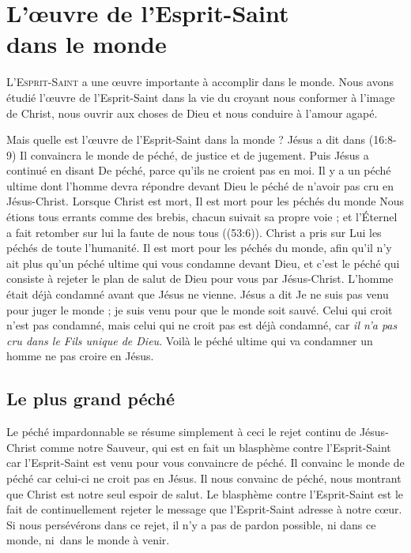 \chapter[L'\oe{}uvre de l'Esprit-Saint dans le monde]{L'\oe{}uvre de l'Esprit-Saint\\ dans le monde}

\lettrine{L}{'Esprit-Saint} a une œuvre importante
 à accomplir dans le monde.
 Nous avons étudié l'œuvre de l'Esprit-Saint dans la vie du croyant\frcolon{}
 nous conformer à l'image de Christ, nous ouvrir aux choses de Dieu
 et nous conduire à l'amour agapé.

Mais quelle est l'œuvre de l'Esprit-Saint dans la monde ?
 Jésus a dit dans (16:8-9)\frcolon{}
 \Og Il convaincra le monde de péché, de justice et de jugement. \Fg{}
 Puis Jésus a continué en disant\frcolon{}
 \Og De péché, parce qu'ils ne croient pas en moi. \Fg{}
 Il y a un péché ultime dont l'homme devra répondre devant Dieu
 \ocadr le péché de n'avoir pas cru en Jésus-Christ.
 Lorsque Christ est mort, Il est mort pour les péchés du monde\frcolon{}
 \Og Nous étions tous errants comme des brebis,
 chacun suivait sa propre voie ;
 et l'Éternel a fait retomber sur lui la faute de nous tous \Fg{}
 ((53:6)).
 Christ a pris sur Lui les péchés de toute l'humanité.
 Il est mort pour les péchés du monde, afin qu'il n'y ait plus qu'un péché
 ultime qui vous condamne devant Dieu, et c'est le péché qui consiste
 à rejeter le plan de salut de Dieu pour vous par Jésus-Christ.
 L'homme était déjà condamné avant que Jésus ne vienne.
 Jésus a dit\frcolon{} \Og Je ne suis pas venu pour juger le monde ;
 je suis venu pour que le monde soit sauvé.
 Celui qui croit n'est pas condamné, mais celui qui ne croit pas
 est déjà condamné, car \emph{il n'a pas cru dans le Fils
 unique de Dieu}. \Fg{}
 Voilà le péché ultime qui va condamner un homme
 \ocadr ne pas croire en Jésus.


\section{Le plus grand p\'ech\'e}


Le péché impardonnable se résume simplement à ceci\frcolon{}
 le rejet continu de Jésus-Christ comme notre Sauveur,
 qui est en fait un blasphème contre l'Esprit-Saint
 car l'Esprit-Saint est venu pour vous con\-vaincre de péché.
 Il \Og convainc le monde de péché \Fg{} car celui-ci
 ne croit pas en Jésus.
 Il nous convainc de péché, nous montrant que Christ
 est notre seul espoir de salut. Le blasphème contre l'Esprit-Saint
 est le fait de continuellement rejeter le message que l'Esprit-Saint adresse à notre cœur.
 Si nous persévérons dans ce rejet, il n'y a pas de pardon possible,
 ni dans ce monde, ni~dans le monde à venir. %


